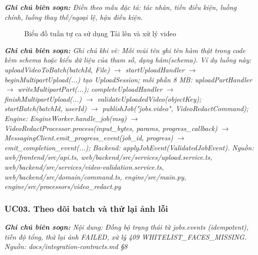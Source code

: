 \documentclass[a4paper,12pt]{article}
\begin{document}
{\small\itshape\noindent\textbf{Ghi chú biên soạn:} Điền theo mẫu đặc tả: tác nhân, tiền điều kiện, luồng chính, luồng thay thế/ngoại lệ, hậu điều kiện.\par\vspace{6pt}}


\begin{figure}[htbp]
\centering
{}
\caption{Biểu đồ tuần tự ca sử dụng Tải lên và xử lý video}
\label{fig:3-6}
\end{figure}

{\small\itshape\noindent\textbf{Ghi chú biên soạn:} Ghi chú khi vẽ: Mỗi mũi tên ghi tên hàm thật trong code kèm schema hoặc kiểu dữ liệu của tham số, dạng hàm(schema). Ví dụ luồng này: uploadVideoToBatch(batchId, File) $\rightarrow$ startUploadHandler $\rightarrow$ beginMultipartUpload(...) tạo UploadSession; mỗi phần 8 MB: uploadPartHandler $\rightarrow$ writeMultipartPart(...); completeUploadHandler $\rightarrow$ finishMultipartUpload(...) $\rightarrow$ validateUploadedVideo(objectKey); startBatch(batchId, userId) $\rightarrow$ publishJob("jobs.video", VideoRedactCommand); Engine: EngineWorker.handle\_job(msg) $\rightarrow$ VideoRedactProcessor.process(input\_bytes, params, progress\_callback) $\rightarrow$ MessagingClient.emit\_progress\_event(job\_id, progress) $\rightarrow$ emit\_completion\_event(...); Backend: applyJobEvent(ValidatedJobEvent).  Nguồn: web/frontend/src/api.ts, web/backend/src/services/upload.service.ts, web/backend/src/services/video-validation.service.ts, web/backend/src/domain/command.ts, engine/src/main.py, engine/src/processors/video\_redact.py\par\vspace{6pt}}


\subsubsection{UC03. Theo dõi batch và thử lại ảnh lỗi}

{\small\itshape\noindent\textbf{Ghi chú biên soạn:} Nội dung: Đồng bộ trạng thái từ jobs.events (idempotent), tiến độ tổng, thử lại ảnh FAILED, xử lý 409 WHITELIST\_FACES\_MISSING.  Nguồn: docs/integration-contracts.md §8\par\vspace{6pt}}
\end{document}
